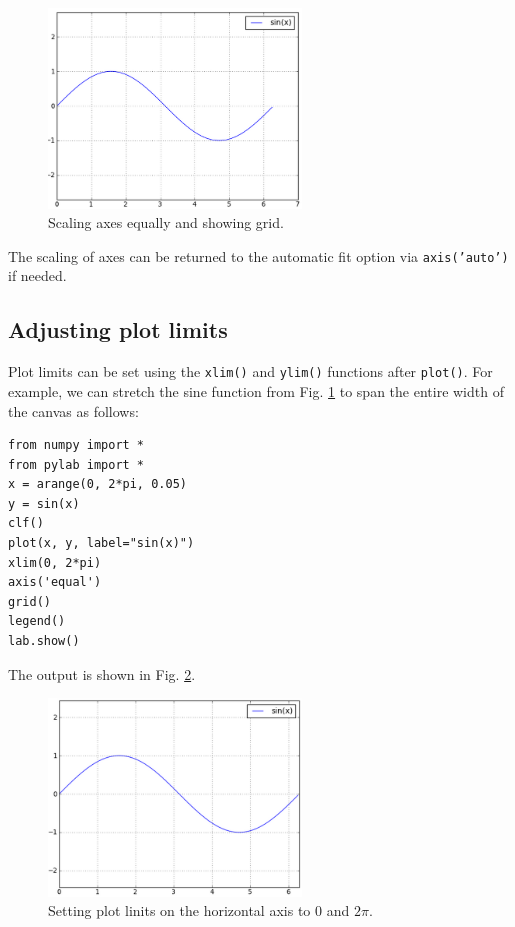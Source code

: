 \begin{figure}[!ht]
\begin{center}
\includegraphics[width=0.6\textwidth]{imgp/plot8.png}
\end{center}
\vspace{-4mm}
\caption{Scaling axes equally and showing grid.}
\label{fig:plot8}
\vspace{-2mm}
\end{figure}
\noindent
The scaling of axes can be returned to the automatic fit option via
{\tt axis('auto')} if needed.

\subsection{Adjusting plot limits}

Plot limits can be set using the {\tt xlim()} and {\tt ylim()}
functions after {\tt plot()}. For example, we can stretch the sine
function from Fig. \ref{fig:plot8} to span the entire width of the 
canvas as follows:

\begin{verbatim}
from numpy import *
from pylab import *
x = arange(0, 2*pi, 0.05)
y = sin(x)
clf()
plot(x, y, label="sin(x)")
xlim(0, 2*pi)
axis('equal')
grid()
legend()
lab.show()
\end{verbatim}
\noindent
The output is shown in Fig. \ref{fig:plot9}.
\newpage

\begin{figure}[!ht]
\begin{center}
\includegraphics[width=0.6\textwidth]{imgp/plot9.png}
\end{center}
\vspace{-4mm}
\caption{Setting plot linits on the horizontal axis to $0$ and $2\pi$.}
\label{fig:plot9}
\vspace{-2mm}
\end{figure}
\noindent


